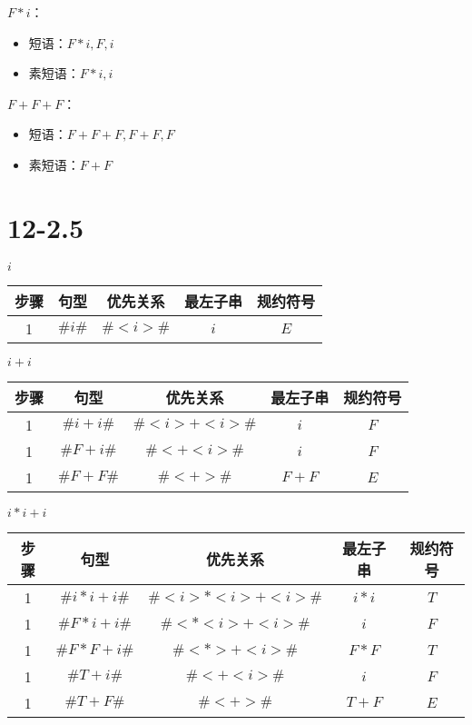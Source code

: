 \documentclass[UTF8]{ctexart}
\begin{document}
    $F*i$：
    \begin{itemize}
        \item 短语：$F*i, F, i$
        \item 素短语：$F*i, i$
    \end{itemize}
    
    $F + F + F$：
    \begin{itemize}
        \item 短语：$F + F + F, F + F, F$
        \item 素短语：$F + F$
    \end{itemize}

\section*{12-2.5}

$i$

\begin{tabular}{|c|c|c|c|c|}
    \hline
    步骤 & 句型 & 优先关系 & 最左子串 & 规约符号 \\
    \hline
    1 & $\#i\#$ & $\# < i > \#$ & $i$ & $E$ \\
    \hline
\end{tabular}

$i+i$

\begin{tabular}{|c|c|c|c|c|}
    \hline
    步骤 & 句型 & 优先关系 & 最左子串 & 规约符号 \\
    \hline
    1 & $\#i+i\#$ & $\# < i > + < i > \#$ & $i$ & $F$ \\
    \hline
    1 & $\#F+i\#$ & $\# < + < i > \#$ & $i$ & $F$ \\
    \hline
    1 & $\#F+F\#$ & $\# <  +  > \#$ & $F+F$ & $E$ \\
    \hline
\end{tabular}

$i*i+i$

\begin{tabular}{|c|c|c|c|c|}
    \hline
    步骤 & 句型 & 优先关系 & 最左子串 & 规约符号 \\
    \hline
    1 & $\#i*i+i\#$ & $\# < i > * < i > + < i > \#$ & $i * i$ & $T$ \\
    \hline
    1 & $\#F*i+i\#$ & $\# < * < i > + < i > \#$ & $i$ & $F$ \\
    \hline
    1 & $\#F*F+i\#$ & $\# < * > + < i > \#$ & $F*F$ & $T$ \\
    \hline
    1 & $\#T+i\#$ & $\# < + < i > \#$ & $i$ & $F$ \\
    \hline
    1 & $\#T+F\#$ & $\# < + > \#$ & $T+F$ & $E$ \\
    \hline
\end{tabular}
\end{document}
